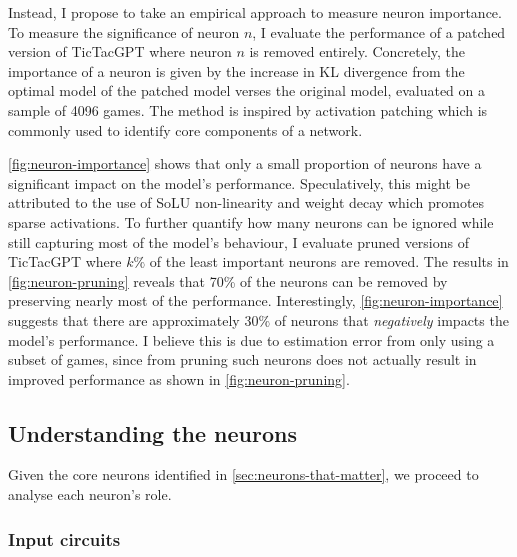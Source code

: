 \documentclass{article}
\newcommand{\ttgpt}{TicTacGPT\xspace}
\begin{document}
Instead, I propose to take an empirical approach to measure neuron importance. To measure the significance of neuron $n$, I evaluate the performance of a patched version of \ttgpt where neuron $n$ is removed entirely. Concretely, the importance of a neuron is given by the increase in KL divergence from the optimal model of the patched model verses the original model, evaluated on a sample of 4096 games. The method is inspired by activation patching \citep{meng2022locating,vig2020investigating} which is commonly used to identify core components of a network.

\cref{fig:neuron-importance} shows that only a small proportion of neurons have a significant impact on the model's performance. Speculatively, this might be attributed to the use of SoLU non-linearity and weight decay which promotes sparse activations. To further quantify how many neurons can be ignored while still capturing most of the model's behaviour, I evaluate pruned versions of \ttgpt where $k\%$ of the least important neurons are removed. The results in \cref{fig:neuron-pruning} reveals that 70\% of the neurons can be removed by preserving nearly most of the performance. Interestingly, \cref{fig:neuron-importance} suggests that there are
approximately $30\%$ of neurons that \emph{negatively} impacts the model's performance. I believe this is due to estimation error from only using a subset of games, since from pruning such neurons does not actually result in improved performance as shown in \cref{fig:neuron-pruning}.

\subsection{Understanding the neurons} \label{sec:neurons-visualisation}

Given the core neurons identified in \cref{sec:neurons-that-matter}, we proceed to analyse each neuron's role.

\subsubsection{Input circuits}
\end{document}

